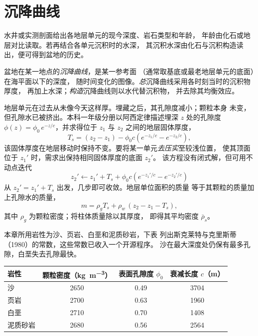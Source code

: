 \section{沉降曲线}\label{sec:b2:basins-compared:curves}

水井或实测剖面给出各地层单元的现今深度、岩石类型和年龄，
年龄由化石或地层对比读取。若再结合各单元沉积时的水深，
其沉积水深由化石与沉积构造读出，便可得到盆地的历史。

\begin{definition}[沉降曲线]\label{def:b2:basins-compared:curve}
盆地在某一地点的\emph{沉降曲线}，是某一参考面
（通常取基底或最老地层单元的底面）在海平面以下的深度，
随时间变化的图像。\emph{总}沉降曲线采用各时刻当时的沉积物厚度，
再加上水深；\emph{构造}沉降曲线则以水代替沉积物，
并去除其均衡效应。
\end{definition}

地层单元在过去从未像今天这样厚。埋藏之后，其孔隙度减小；颗粒本身
未变，但孔隙水已被挤出。本科一年级分册以阿西定律描述埋深
$z$ 处的孔隙度 $\phi(z) = \phi_0\,e^{-z/c}$，并求得位于
$z_1$ 与 $z_2$ 之间的地层固体厚度，
\[
  T_s = (z_2 - z_1) - \phi_0 c\left(e^{-z_1/c} - e^{-z_2/c}\right),
\]
该固体厚度在地层移动时保持不变。要将某一单元\emph{去压实}至较浅位置，
使其顶面位于 $z_1'$ 时，需求出保持相同固体厚度的底面 $z_2'$。
该方程没有闭式解，但可用不动点迭代
\[
  z_2' \leftarrow z_1' + T_s + \phi_0 c\left(e^{-z_1'/c} - e^{-z_2'/c}\right)
\]
从 $z_2' = z_1' + T_s$ 出发，几步即可收敛。地层单位面积的质量
等于其颗粒的质量加上孔隙水的质量，
\[
  m = \rho_g T_s + \rho_w\,(z_2 - z_1 - T_s),
\]
其中 $\rho_g$ 为颗粒密度；将柱体质量除以其厚度，
即得其平均密度 $\bar\rho_s$。

本章所用岩性为沙、页岩、白垩和泥质砂岩，下表
列出斯克莱特与克里斯蒂（1980）的常数，这些常数已收入一个开源程序。
沙在最大深度处仍保有最多孔隙，白垩失去孔隙最快。

\begin{center}
\small
\begin{tabular}{lccc}
\hline
岩性 & 颗粒密度（\unit{kg.m^{-3}}） & 表面孔隙度 $\phi_0$ & 衰减长度 $c$（\unit{m}） \\
\hline
沙 & 2650 & 0.49 & 3704 \\
页岩 & 2700 & 0.63 & 1960 \\
白垩 & 2710 & 0.70 & 1408 \\
泥质砂岩 & 2680 & 0.56 & 2564 \\
\hline
\end{tabular}
\end{center}

